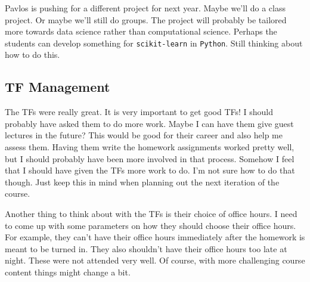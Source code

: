 \documentclass[11pt]{article}
\begin{document}
      Pavlos is pushing for a different project for next year.  Maybe we'll do a
class project.  Or maybe we'll still do groups.  The project will probably be
tailored more towards data science rather than computational science.  Perhaps
the students can develop something for \texttt{scikit-learn} in \texttt{Python}.
Still thinking about how to do this.
    \subsection{TF Management}
      The TFs were really great.  It is very important to get good TFs!  I
should probably have asked them to do more work.  Maybe I can have them give
guest lectures in the future?  This would be good for their career and also help
me assess them.  Having them write the homework assignments worked pretty well,
but I should probably have been more involved in that process.  Somehow I feel
that I should have given the TFs more work to do.  I'm not sure how to do that
though.  Just keep this in mind when planning out the next iteration of the
course.

      Another thing to think about with the TFs is their choice of office hours.
I need to come up with some parameters on how they should choose their office
hours.  For example, they can't have their office hours immediately after the
homework is meant to be turned in.  They also shouldn't have their office hours
too late at night.  These were not attended very well.  Of course, with more
challenging course content things might change a bit.
\end{document}
